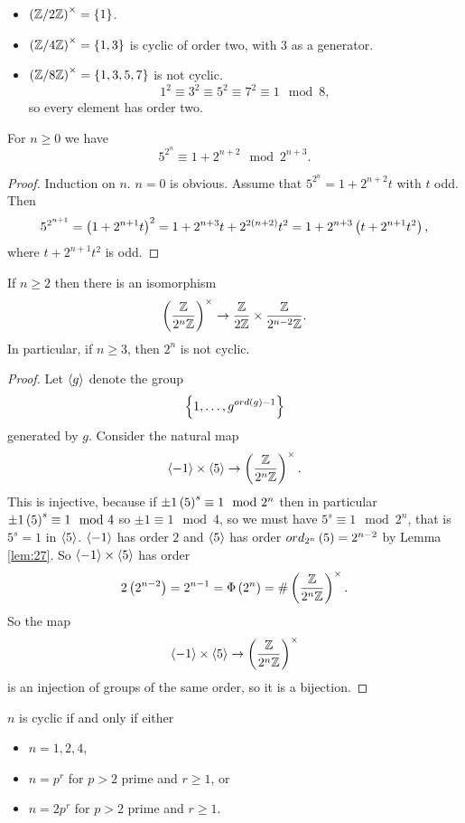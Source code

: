 \begin{example*}
\hfill
\begin{itemize}
\item $ \left( \mathbb{Z} / 2\mathbb{Z} \right)^\times = \left\{ 1 \right\} $.
\item $ \left( \mathbb{Z} / 4\mathbb{Z} \right)^\times = \left\{ 1, 3 \right\} $ is cyclic of order two, with $ 3 $ as a generator.
\item $ \left( \mathbb{Z} / 8\mathbb{Z} \right)^\times = \left\{ 1, 3, 5, 7 \right\} $ is not cyclic.
$$ 1^2 \equiv 3^2 \equiv 5^2 \equiv 7^2 \equiv 1 \mod 8, $$
so every element has order two.
\end{itemize}
\end{example*}

\begin{lemma}
\label{lem:27}
For $ n \ge 0 $ we have
$$ 5^{2^n} \equiv 1 + 2^{n + 2} \mod 2^{n + 3}. $$
\end{lemma}

\begin{proof}
Induction on $ n $. $ n = 0 $ is obvious. Assume that $ 5^{2^n} = 1 + 2^{n + 2}t $ with $ t $ odd. Then
$$ 5^{2^{n + 1}} = \left( 1 + 2^{n + 1}t \right)^2 = 1 + 2^{n + 3}t + 2^{2\left( n + 2 \right)}t^2 = 1 + 2^{n + 3}\left( t + 2^{n + 1}t^2 \right), $$
where $ t + 2^{n + 1}t^2 $ is odd.
\end{proof}

\begin{proposition}
If $ n \ge 2 $ then there is an isomorphism
$$ \left( \dfrac{\mathbb{Z}}{2^n\mathbb{Z}} \right)^\times \to \dfrac{\mathbb{Z}}{2\mathbb{Z}} \times \dfrac{\mathbb{Z}}{2^{n - 2}\mathbb{Z}}. $$
In particular, if $ n \ge 3 $, then $ \unit{2^n} $ is not cyclic.
\end{proposition}

\begin{proof}
Let $ \left\langle g \right\rangle $ denote the group
$$ \left\{ 1, \dots, g^{ord\left( g \right) - 1} \right\} $$
generated by $ g $. Consider the natural map
$$ \left\langle -1 \right\rangle \times \left\langle 5 \right\rangle \to \left( \dfrac{\mathbb{Z}}{2^n\mathbb{Z}} \right)^\times. $$
This is injective, because if $ \pm 1\left( 5 \right)^s \equiv 1 \mod 2^n $ then in particular $ \pm 1\left( 5 \right)^s \equiv 1 \mod 4 $ so $ \pm 1 \equiv 1 \mod 4 $, so we must have $ 5^s \equiv 1 \mod 2^n $, that is $ 5^s = 1 $ in $ \left\langle 5 \right\rangle $. $ \left\langle -1 \right\rangle $ has order $ 2 $ and $ \left\langle 5 \right\rangle $ has order $ ord_{2^n}\left( 5 \right) = 2^{n - 2} $ by Lemma \ref{lem:27}. So $ \left\langle -1 \right\rangle \times \left\langle 5 \right\rangle $ has order
$$ 2\left( 2^{n - 2} \right) = 2^{n - 1} = \Phi\left( 2^n \right) = \#\left( \dfrac{\mathbb{Z}}{2^n\mathbb{Z}} \right)^\times. $$
So the map
$$ \left\langle -1 \right\rangle \times \left\langle 5 \right\rangle \to \left( \dfrac{\mathbb{Z}}{2^n\mathbb{Z}} \right)^\times $$
is an injection of groups of the same order, so it is a bijection.
\end{proof}

\begin{theorem}
$ \unit{n} $ is cyclic if and only if either
\begin{itemize}
\item $ n = 1, 2, 4 $,
\item $ n = p^r $ for $ p > 2 $ prime and $ r \ge 1 $, or
\item $ n = 2p^r $ for $ p > 2 $ prime and $ r \ge 1 $.
\end{itemize}
\end{theorem}

